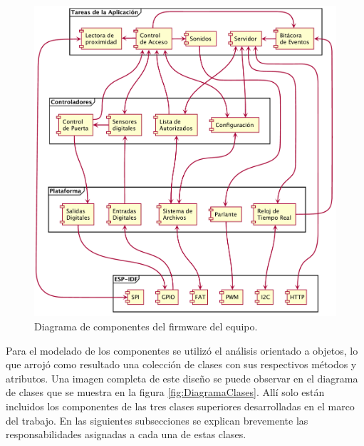 \begin{figure}[ht]
	\centering
	\includegraphics[width=\textwidth]{./Figures/PNK-DC001.pdf}
	\caption[Diagrama de componentes del firmware del equipo]{Diagrama de componentes del firmware del equipo.}
	\label{fig:DiagramaComponentes}
\end{figure}

Para el modelado de los componentes se utilizó el análisis orientado a objetos, lo que arrojó como resultado una colección de clases con sus respectivos métodos y atributos. Una imagen completa de este diseño se puede observar en el diagrama de clases que se muestra en la figura \ref{fig:DiagramaClases}. Allí solo están incluidos los componentes de las tres clases superiores desarrolladas en el marco del trabajo. En las siguientes subsecciones se explican brevemente las responsabilidades asignadas a cada una de estas clases.

